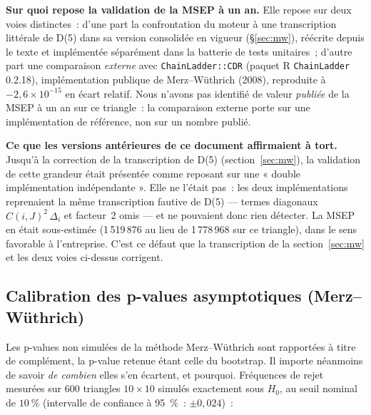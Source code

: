 \documentclass[a4paper,11pt]{article}
\newcommand{\code}[1]{\texttt{\small #1}}
\begin{document}
\medskip
\begin{encadre}
\textbf{Sur quoi repose la validation de la MSEP à un an.} Elle repose sur deux
voies distinctes~: d'une part la confrontation du moteur à une transcription
littérale de D(5) dans sa version consolidée en vigueur (§\ref{sec:mw}), réécrite depuis le texte et implémentée
séparément dans la batterie de tests unitaires~; d'autre part une comparaison
\emph{externe} avec \code{ChainLadder::CDR} (paquet R \code{ChainLadder}
0.2.18), implémentation publique de Merz--Wüthrich (2008), reproduite à
$-2{,}6\times10^{-15}$ en écart relatif. Nous n'avons pas identifié de valeur
\emph{publiée} de la MSEP à un an sur ce triangle~: la comparaison externe porte
sur une implémentation de référence, non sur un nombre publié.

\medskip
\textbf{Ce que les versions antérieures de ce document affirmaient à tort.}
Jusqu'à la correction de la transcription de D(5)
(section~\ref{sec:mw}), la validation de cette grandeur était présentée comme
reposant sur une « double implémentation indépendante ». Elle ne l'était
pas~: les deux implémentations reprenaient la même transcription fautive de
D(5) --- termes diagonaux $\hat C(i,J)^2\,\Delta_i$ et facteur~2
omis --- et ne pouvaient donc rien détecter. La MSEP en était sous-estimée
(1\,519\,876 au lieu de 1\,778\,968 sur ce triangle), dans le sens favorable à
l'entreprise. C'est ce défaut que la transcription de la
section~\ref{sec:mw} et les deux voies ci-dessus corrigent.
\end{encadre}

\subsection{Calibration des p-values asymptotiques (Merz--Wüthrich)}
\label{sec:calib-asympt-mw}

Les p-values non simulées de la méthode Merz--Wüthrich sont rapportées à titre de
complément, la p-value retenue étant celle du bootstrap. Il importe néanmoins de
savoir \emph{de combien} elles s'en écartent, et pourquoi. Fréquences de rejet
mesurées sur 600 triangles $10\times10$ simulés exactement sous $H_0$, au seuil
nominal de $10~\%$ (intervalle de confiance à 95~\%~: $\pm 0{,}024$)~:
\end{document}
